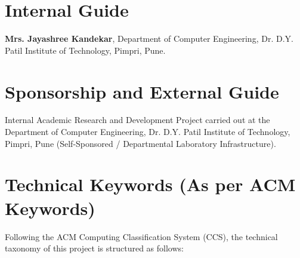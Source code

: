 \documentclass[oneside,a4paper,12pt]{report}
\newcommand{\GuideName}{Mrs. Jayashree Kandekar}
\begin{document}
\section{Internal Guide}
\textbf{\GuideName}, Department of Computer Engineering, Dr. D.Y. Patil Institute of Technology, Pimpri, Pune.

\section{Sponsorship and External Guide}
Internal Academic Research and Development Project carried out at the Department of Computer Engineering, Dr. D.Y. Patil Institute of Technology, Pimpri, Pune (Self-Sponsored / Departmental Laboratory Infrastructure).

\section{Technical Keywords (As per ACM Keywords)}
Following the ACM Computing Classification System (CCS), the technical taxonomy of this project is structured as follows:
\end{document}
